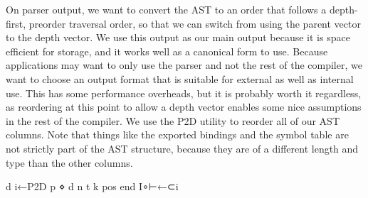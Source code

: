 \documentclass{article}%
\begin{document}
\nwenddocs{}On parser output,
we want to convert the AST to an order that follows a 
depth-first, preorder traversal order, 
so that we can switch from using the parent vector to the depth
vector.
We use this output as our main output because it is space efficient
for storage, and it works well as a canonical form to use.
Because applications may want to only use the parser and not the 
rest of the compiler, 
we want to choose an output format that is suitable for external 
as well as internal use.
This has some performance overheads,
but it is probably worth it regardless,
as reordering at this point to allow a depth vector enables some 
nice assumptions in the rest of the compiler.
We use the {\Tt{}P2D\nwendquote} utility to reorder all of our AST columns.
Note that things like the exported bindings and the symbol table 
are not strictly part of the AST structure, because they are of a 
different length and type than the other columns.

\nwenddocs{}\endmoddef\nwstartdeflinemarkup{}\nwenddeflinemarkup
d i←P2D p ⋄ d n t k pos end I∘⊢←⊂i
\nwendcode{}\nwdocspar
\end{document}
